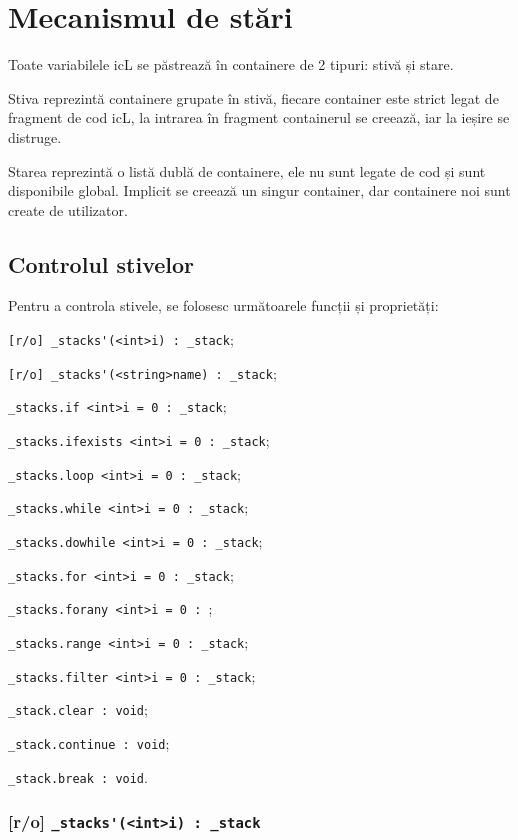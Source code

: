 \section{Mecanismul de stări}

Toate variabilele icL se păstrează în containere de 2 tipuri: stivă și stare.

Stiva reprezintă containere grupate în stivă, fiecare container este strict legat de fragment de cod icL, la intrarea în fragment containerul se creează, iar la ieșire se distruge.

Starea reprezintă o listă dublă de containere, ele nu sunt legate de cod și sunt disponibile global. Implicit se creează un singur container, dar containere noi sunt create de utilizator.

\subsection{Controlul stivelor}

Pentru a controla stivele, se folosesc următoarele funcții și proprietăți:
\begin{icItems}
	\item \lstinline|[r/o] _stacks'(<int>i) : _stack|;
	\item \lstinline|[r/o] _stacks'(<string>name) : _stack|;
	\item \lstinline|_stacks.if <int>i = 0 : _stack|;
	\item \lstinline|_stacks.ifexists <int>i = 0 : _stack|;
	\item \lstinline|_stacks.loop <int>i = 0 : _stack|;
	\item \lstinline|_stacks.while <int>i = 0 : _stack|;
	\item \lstinline|_stacks.dowhile <int>i = 0 : _stack|;
	\item \lstinline|_stacks.for <int>i = 0 : _stack|;
	\item \lstinline|_stacks.forany <int>i = 0 : |;
	\item \lstinline|_stacks.range <int>i = 0 : _stack|;
	\item \lstinline|_stacks.filter <int>i = 0 : _stack|;
	\item \lstinline|_stack.clear : void|;
	\item \lstinline|_stack.continue : void|;
	\item \lstinline|_stack.break : void|.
\end{icItems}

\subsubsection{[r/o] \lstinline|_stacks'(<int>i) : _stack|}

